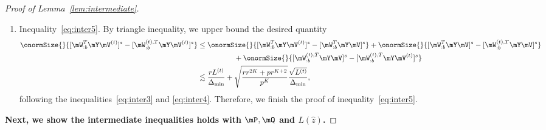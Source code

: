 \documentclass[lettersize,onecolumn,journal]{IEEEtran}
\theoremstyle{definition}
\theoremstyle{definition}
\begin{document}
\begin{proof}[Proof of Lemma~\ref{lem:intermediate}]
\begin{enumerate}[wide]
    
    For $J_2$ and $J_3$, recall that $\onormSize{}{\mW_{:b}^{(t),T} \mX \mV }$ and $\onormSize{}{\mW_{:b}^{(t),T} \mX \mV^{(t)} }$ are lower bounded by inequalities~\eqref{eq:i11_sin_dom} and \eqref{eq:j11_wxvt}, respectively. By triangle inequality and inequality \eqref{eq:cond1} in Condition~\ref{cond:origin}, we have 
    \begin{equation}\label{eq:j2}
        J_2 \leq \frac{ \onormSize{}{\mW_{:b}^{(t),T} \mE \mV}  }{  \onormSize{}{\mW_{:b}^{(t),T} \mX \mV} } \lesssim \onormSize{}{\mW_{:b}^{(t),T} \mE \mV} \lesssim \frac{r^K}{p^{K/2}},
    \end{equation}
    and 
    \begin{equation}\label{eq:j3}
        J_3 \leq \frac{ \onormSize{}{\mW_{:b}^{(t),T} \mE \mV^{(t)}}  }{  \onormSize{}{\mW_{:b}^{(t),T} \mX \mV^{(t)}} } \lesssim \onormSize{}{\mW_{:b}^{(t),T} \mE \mV} \lesssim \frac{r^K}{p^{K/2}}.
    \end{equation}
    
    Therefore, combining the inequalities~\eqref{eq:j1}, \eqref{eq:j2}, and \eqref{eq:j3}, we finish the proof of inequality~\eqref{eq:inter4}. 
    
    

    \item Inequality~\eqref{eq:inter5}. By triangle inequality, we upper bound the desired quantity 
    \begin{align}
        \onormSize{}{ [ \mW_{:b}^T \mY \mV^{(t)} ]^s   -  [ \mW_{:b}^{(t), T} \mY \mV^{(t)} ]^s } &\leq \onormSize{}{[ \mW_{:b}^T \mY \mV^{(t)} ]^s - [ \mW_{:b}^T \mY \mV ]^s }  + \onormSize{}{[\mW_{:b}^T \mY \mV ]^s  - [ \mW_{:b}^{(t),T} \mY \mV ]^s } \\
        & \quad \quad \quad\quad\quad+ \onormSize{}{[\mW_{:b}^{(t),T} \mY \mV ]^s  -  [\mW_{:b}^{(t), T} \mY \mV^{(t)} ]^s }\\
        &\lesssim \frac{r L^{(t)}}{\Delta_{\min}} + \sqrt{ \frac{rr^{2K} + p r^{K+2}}{p^{K}}}  \frac{\sqrt{L^{(t)}}}{\Delta_{\min}},
    \end{align}
    following the inequalities~\eqref{eq:inter3} and \eqref{eq:inter4}. Therefore, we finish the proof of inequality~\eqref{eq:inter5}.
        \end{enumerate}
  {
    
  \textbf{Next, we show the intermediate inequalities holds with $\mP, \mQ$ and $L(\hat z)$.}
        
}
\end{proof}
\end{document}
